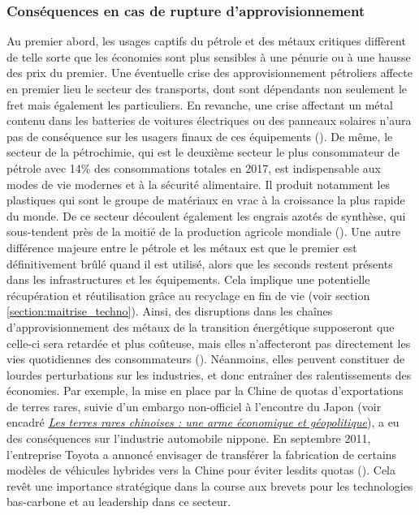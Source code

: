 \subsubsection{Conséquences en cas de rupture d'approvisionnement}
Au premier abord, les usages captifs du pétrole et des métaux critiques diffèrent de telle sorte que les économies sont plus sensibles à une pénurie ou à une hausse des prix du premier. Une éventuelle crise des approvisionnement pétroliers affecte en premier lieu le secteur des transports, dont sont dépendants non seulement le fret mais également les particuliers. En revanche, une crise affectant un métal contenu dans les batteries de voitures électriques ou des panneaux solaires n'aura pas de conséquence sur les usagers finaux de ces équipements (\cite{iea_role_2021}).
\smallbreak
De même, le secteur de la pétrochimie, qui est le deuxième secteur le plus consommateur de pétrole avec 14\% des consommations totales en 2017, est indispensable aux modes de vie modernes et à la sécurité alimentaire. Il produit notamment les plastiques qui sont le groupe de matériaux en vrac à la croissance la plus rapide du monde. De ce secteur découlent également les engrais azotés de synthèse, qui sous-tendent près de la moitié de la production agricole mondiale (\cite{iea_future_2018}). 
\smallbreak
Une autre différence majeure entre le pétrole et les métaux est que le premier est définitivement brûlé quand il est utilisé, alors que les seconds restent présents dans les infrastructures et les équipements. Cela implique une potentielle récupération et réutilisation grâce au recyclage en fin de vie (voir section \ref{section:maitrise_techno}).
\smallbreak
Ainsi, des disruptions dans les chaînes d'approvisionnement des métaux de la transition énergétique supposeront que celle-ci sera retardée et plus coûteuse, mais elles n'affecteront pas directement les vies quotidiennes des consommateurs (\cite{iea_role_2021}). Néanmoins, elles peuvent constituer de lourdes perturbations sur les industries, et donc entraîner des ralentissements des économies. Par exemple, la mise en place par la Chine de quotas d'exportations de terres rares, suivie d'un embargo non-officiel à l'encontre du Japon (voir encadré \hyperref[Chine]{\textit{Les terres rares chinoises : une arme économique et géopolitique}}), a eu des conséquences sur l'industrie automobile nippone. En septembre 2011, l'entreprise Toyota a annoncé envisager de transférer la fabrication de certains modèles de véhicules hybrides vers la Chine pour éviter lesdits quotas (\cite{niquet_chine_2011}). Cela revêt une importance stratégique dans la course aux brevets pour les technologies bas-carbone et au leadership dans ce secteur.
